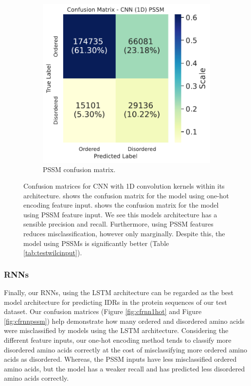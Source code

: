 \documentclass{l4proj}
\begin{document}
\begin{figure}[!htb]
\begin{subfigure}[b]{0.48\textwidth}
        \includegraphics[width=\textwidth]{images/confmats/CNN1Dpssm-cf.pdf}
        \caption{PSSM confusion matrix.}
        \label{fig:cf1dpssm}
    \end{subfigure}
    \caption{Confusion matrices for CNN with 1D convolution kernels within its architecture.  shows the confusion matrix for the model using one-hot encoding feature input.  shows the confusion matrix for the model using PSSM feature input. We see this models architecture has a sensible precision and recall. Furthermore, using PSSM features reduces misclassification, however only marginally. Despite this, the model using PSSMs is significantly better (Table \ref{tab:testwilcinput}).}
    \label{fig:cf1d}
\end{figure}

\subsubsection{RNNs \newline}
Finally, our RNNs, using the LSTM architecture can be regarded as the best model architecture for predicting IDRs in the protein sequences of our test dataset. Our confusion matrices (Figure \ref{fig:cfrnn1hot} and Figure \ref{fig:cfrnnpssm}) help demonstrate how many ordered and disordered amino acids were misclassified by models using the LSTM architecture. Considering the different feature inputs, our one-hot encoding method tends to classify more disordered amino acids correctly at the cost of misclassifying more ordered amino acids as disordered. Whereas, the PSSM inputs have less misclassified ordered amino acids, but the model has a weaker recall and has predicted less disordered amino acids correctly.
\end{document}
